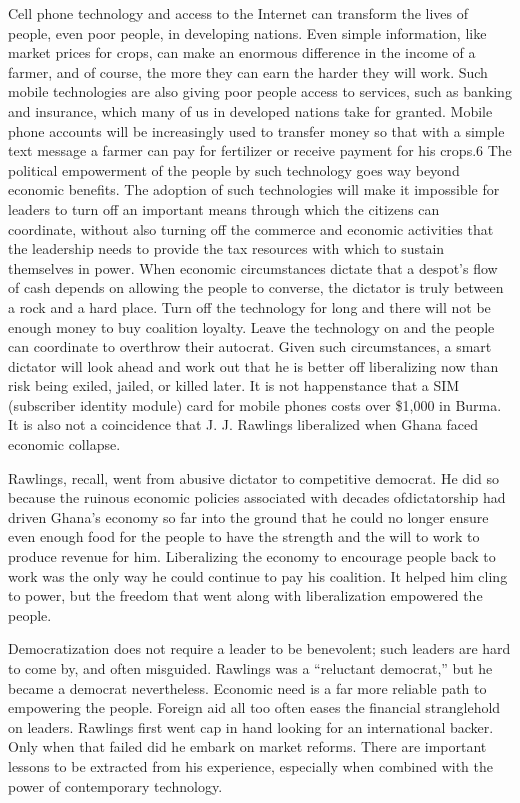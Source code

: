 \documentclass[10pt]{article}
\begin{document}
{\large Cell phone technology and access to the Internet can transform the lives
of people, even poor people, in developing nations. Even simple information, like
market prices for crops, can make an enormous difference in the income of a
farmer, and of course, the more they can earn the harder they will work. Such
mobile technologies are also giving poor people access to services, such as
banking and insurance, which many of us in developed nations take for granted.
Mobile phone accounts will be increasingly used to transfer money so that with a
simple text message a farmer can pay for fertilizer or receive payment for his
crops.6 The political empowerment of the people by such technology goes way
beyond economic benefits. The adoption of such technologies will make it
impossible for leaders to turn off an important means through which the citizens
can coordinate, without also turning off the commerce and economic activities
that the leadership needs to provide the tax resources with which to sustain
themselves in power. When economic circumstances dictate that a despot's flow of
cash depends on allowing the people to converse, the dictator is truly between a
rock and a hard place. Turn off the technology for long and there will not be
enough money to buy coalition loyalty. Leave the technology on and the people can
coordinate to overthrow their autocrat. Given such circumstances, a smart
dictator will look ahead and work out that he is better off liberalizing now than
risk being exiled, jailed, or killed later. It is not happenstance that a SIM
(subscriber identity module) card for mobile phones costs over \$1,000 in Burma.
It is also not a coincidence that J. J. Rawlings liberalized when Ghana faced
economic collapse.}

{\large Rawlings, recall, went from abusive dictator to competitive democrat. He
did so because the ruinous economic policies associated with decades
ofdictatorship had driven Ghana's economy so far into the ground that he could no
longer ensure even enough food for the people to have the strength and the will
to work to produce revenue for him. Liberalizing the economy to encourage people
back to work was the only way he could continue to pay his coalition. It helped
him cling to power, but the freedom that went along with liberalization empowered
the people.}

{\large Democratization does not require a leader to be benevolent; such leaders
are hard to come by, and often misguided. Rawlings was a ``reluctant democrat,''
but he became a democrat nevertheless. Economic need is a far more reliable path
to empowering the people. Foreign aid all too often eases the financial
stranglehold on leaders. Rawlings first went cap in hand looking for an
international backer. Only when that failed did he embark on market reforms.
There are important lessons to be extracted from his experience, especially when
combined with the power of contemporary technology.}
\end{document}
